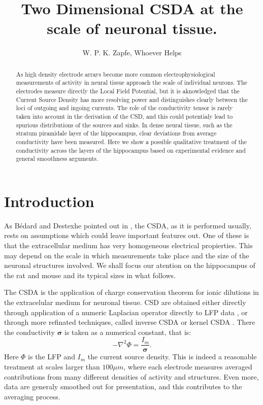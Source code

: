 \documentclass{article}
\title{Two Dimensional CSDA at the scale of neuronal tissue.}
\author{W. P. K. Zapfe, Whoever Helps}
\newcommand{\cond}{\boldsymbol{\sigma}}
\begin{document}
\maketitle

\begin{abstract}
As high density electrode arrays become more common 
electrophysiological measurements of activity in neural tissue approach
the scale of individual neurons. The electrodes measure
directly the Local Field Potential, but it is aknowledged that the
Current Source Density has more resolving power and distinguishes
clearly between the loci of outgoing and ingoing currents.
 The role of the conductivity tensor is rarely taken into account
in the derivation of the CSD, and this could potentialy lead to
spurious distributions of the sources and sinks. 
In dense neural tissue, such as the
stratum piramidale layer of the hippocampus, clear
deviations from average conductivity have been measured. 
Here we show a possible qualitative treatment of the conductivity
across the layers of the hippocampus based on experimental evidence
and general smoothness arguments.
\end{abstract}


\section{Introduction}

As Bédard and Destexhe pointed out in \cite{Bedard11}, the CSDA, as it
is performed usually, rests on
assumptions which could leave important features out. One of these 
is that the extracellular medium has very homogeneous 
electrical propierties. This may depend on the scale in which measurements
take place and the size of the neuronal structures involved. We shall
focus our atention on the hippocampus of the rat and mouse
 and its typical sizes in what follows. 

The CSDA is the application of charge conservation theorem
for ionic dilutions in the extracelular medium for neuronal
tissue. CSD are obtained either directly through application
of a numeric Laplacian operator directly to LFP data \cite{Nicholson75}, 
or through  more refinated
techniques, called inverse CSDA \cite{Pettersen2006, Leski2011} or kernel CSDA 
\cite{Potworowsky2011}. There the conductivity $\cond$ is taken as 
 a numerical constant, that is:
\begin{equation}\label{CSDasLaplacian}
-\nabla^2 \Phi = \frac{I_m}{\cond}. 
\end{equation}
Here $\Phi$ is the LFP and $I_m$ the current source density. 
This is indeed a reasonable treatment at scales larger than $100\mu m$,
where each electrode measures averaged contributions from many different
densities of activity and structures. Even more, data are 
generaly smoothed out for presentation, and this contributes to the
averaging process.
\end{document}
